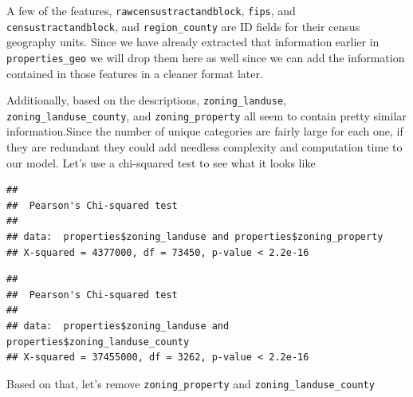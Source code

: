 \documentclass[]{book}
\newenvironment{Shaded}{\begin{snugshade}}{\end{snugshade}}
\newcommand{\KeywordTok}[1]{\textcolor[rgb]{0.13,0.29,0.53}{\textbf{#1}}}
\newcommand{\OperatorTok}[1]{\textcolor[rgb]{0.81,0.36,0.00}{\textbf{#1}}}
\newcommand{\NormalTok}[1]{#1}
\theoremstyle{definition}
\theoremstyle{definition}
\theoremstyle{definition}
\theoremstyle{remark}
\begin{document}
A few of the features, \texttt{rawcensustractandblock}, \texttt{fips},
and \texttt{censustractandblock}, and \texttt{region\_county} are ID
fields for their census geography units. Since we have already extracted
that information earlier in \texttt{properties\_geo} we will drop them
here as well since we can add the information contained in those
features in a cleaner format later.

Additionally, based on the descriptions, \texttt{zoning\_landuse},
\texttt{zoning\_landuse\_county}, and \texttt{zoning\_property} all seem
to contain pretty similar information.Since the number of unique
categories are fairly large for each one, if they are redundant they
could add needless complexity and computation time to our model. Let's
use a chi-squared test to see what it looks like

\begin{Shaded}
\end{Shaded}

\begin{verbatim}
## 
##  Pearson's Chi-squared test
## 
## data:  properties$zoning_landuse and properties$zoning_property
## X-squared = 4377000, df = 73450, p-value < 2.2e-16
\end{verbatim}

\begin{Shaded}
\end{Shaded}

\begin{verbatim}
## 
##  Pearson's Chi-squared test
## 
## data:  properties$zoning_landuse and properties$zoning_landuse_county
## X-squared = 37455000, df = 3262, p-value < 2.2e-16
\end{verbatim}

Based on that, let's remove \texttt{zoning\_property} and
\texttt{zoning\_landuse\_county}
\end{document}

